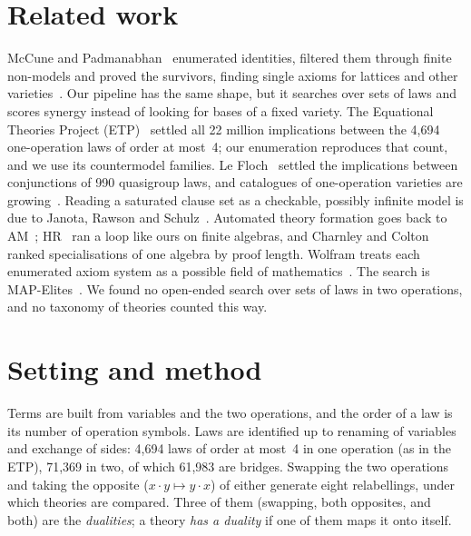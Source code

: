 \documentclass[11pt]{article}
\newcommand{\op}{\cdot}
\begin{document}
\section{Related work}\label{sec:related}

McCune and Padmanabhan~\cite{mccune1996} enumerated identities, filtered them through finite non-models and proved
the survivors, finding single axioms for lattices and other varieties~\cite{mpv2003}. Our pipeline has the same
shape, but it searches over sets of laws and scores synergy instead of looking for bases of a fixed variety. The
Equational Theories Project (ETP)~\cite{etp} settled all 22 million implications between the 4{,}694 one-operation
laws of order at most~4; our enumeration reproduces that count, and we use its countermodel families. Le
Floch~\cite{lefloch2026} settled the implications between conjunctions of 990 quasigroup laws, and catalogues of
one-operation varieties are growing~\cite{lefloch2026sg,semibase2026}. Reading a saturated clause set as a checkable,
possibly infinite model is due to Janota, Rawson and Schulz~\cite{janota2026}. Automated theory formation goes back to
AM~\cite{lenat1976}; HR~\cite{colton1999} ran a loop like ours on finite algebras, and Charnley and
Colton~\cite{charnley2008} ranked specialisations of one algebra by proof length. Wolfram treats each enumerated axiom
system as a possible field of mathematics~\cite{wolfram2022}. The search is MAP-Elites~\cite{mapelites2015}. We found
no open-ended search over sets of laws in two operations, and no taxonomy of theories counted this way.

\section{Setting and method}

Terms are built from variables and the two operations, and the order of a law is its number of operation symbols.
Laws are identified up to renaming of variables and exchange of sides: 4{,}694 laws of order at most~4 in one
operation (as in the ETP), 71{,}369 in two, of which 61{,}983 are bridges. Swapping the two operations and taking the
opposite ($x\op y\mapsto y\op x$) of either generate eight relabellings, under which theories are compared. Three of
them (swapping, both opposites, and both) are the \emph{dualities}; a theory \emph{has a duality} if one of them maps
it onto itself.
\end{document}
